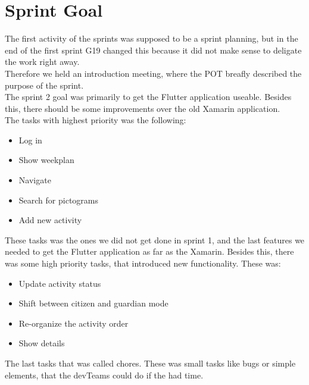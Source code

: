 \section{Sprint Goal}

The first activity of the sprints was supposed to be a sprint planning, but in the end of the first sprint \gls{G19} changed this because it did not make sense to deligate the work right away.\\
Therefore we held an introduction meeting, where the \gls{POT} breafly described the purpose of the sprint.\\
The sprint 2 goal was primarily to get the Flutter application useable. Besides this, there should be some improvements over the old Xamarin application.\\
The tasks with highest priority was the following:

\begin{itemize}
    \item Log in
    \item Show weekplan
    \item Navigate
    \item Search for pictograms
    \item Add new activity
\end{itemize}

These tasks was the ones we did not get done in sprint 1, and the last features we needed to get the Flutter application as far as the Xamarin.
Besides this, there was some high priority tasks, that introduced new functionality. These was:

\begin{itemize}
    \item Update activity status
    \item Shift between citizen and guardian mode
    \item Re-organize the activity order
    \item Show details
\end{itemize}

The last tasks that was called chores. These was small tasks like bugs or simple elements, that the \glspl{devTeam} could do if the had time. 